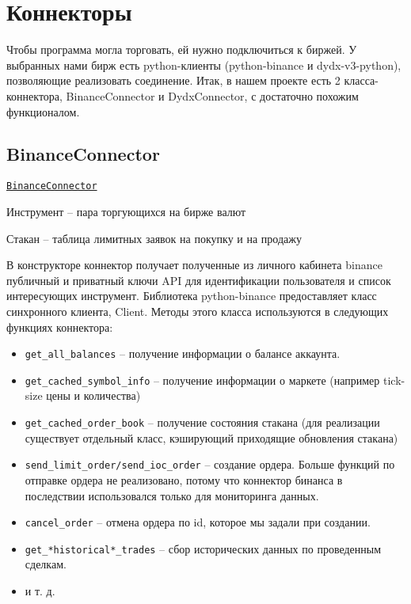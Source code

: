 \section{Коннекторы}

Чтобы программа могла торговать, ей нужно подключиться к биржей. У выбранных нами бирж есть python-клиенты (python-binance и dydx-v3-python), позволяющие реализовать соединение. Итак, в нашем проекте есть 2 класса-коннектора, BinanceConnector и DydxConnector, с достаточно похожим функционалом.

\subsection{BinanceConnector}

\href{https://github.com/dexety/dex-trading-system/blob/main/connectors/binance/connector.py}{\texttt{BinanceConnector}}

\begin{definition}
Инструмент -- пара торгующихся на бирже валют
\end{definition}
\begin{definition}
Стакан -- таблица лимитных заявок на покупку и на продажу
\end{definition}

В конструкторе коннектор получает полученные из личного кабинета binance публичный и приватный ключи API для идентификации пользователя и список интересующих инструмент. Библиотека python-binance предоставляет класс синхронного клиента, Client. Методы этого класса используются в следующих функциях коннектора:

\begin{itemize}
    \item \texttt{get\_all\_balances} -- получение информации о балансе аккаунта.
    \item \texttt{get\_cached\_symbol\_info} -- получение информации о маркете (например tick-size цены и количества)
    \item \texttt{get\_cached\_order\_book} -- получение состояния стакана (для реализации существует отдельный класс, кэширующий приходящие обновления стакана)
    \item \texttt{send\_limit\_order/send\_ioc\_order} -- создание ордера. Больше функций по отправке ордера не реализовано, потому что коннектор бинанса в последствии использовался только для мониторинга данных.
    \item \texttt{cancel\_order} -- отмена ордера по id, которое мы задали при создании.
    \item \texttt{get\_*historical*\_trades} -- сбор исторических данных по проведенным сделкам.
    \item и т. д.
\end{itemize}

